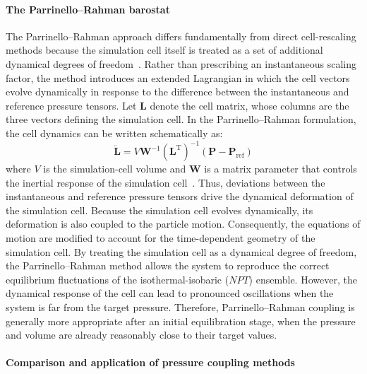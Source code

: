 \paragraph{The Parrinello--Rahman barostat}
The Parrinello--Rahman approach differs fundamentally from direct cell-rescaling methods because the simulation cell itself is treated as a set of additional dynamical degrees of freedom~\cite{Parrinello1981}. Rather than prescribing an instantaneous scaling factor, the method introduces an extended Lagrangian in which the cell vectors evolve dynamically in response to the difference between the instantaneous and reference pressure tensors.
Let $\mathbf{L}$ denote the cell matrix, whose columns are the three vectors defining the simulation cell. In the Parrinello--Rahman formulation, the cell dynamics can be written schematically as:
\begin{equation}\label{eq:parrinellorahman1}
\ddot{\mathbf{L}}
=
V\mathbf{W}^{-1}
\left(\mathbf{L}^{\mathrm{T}}\right)^{-1}
\left(
\mathbf{P}
-
\mathbf{P}_{\mathrm{ref}}
\right)
\end{equation}
where $V$ is the simulation-cell volume and $\mathbf{W}$ is a matrix parameter that controls the inertial response of the simulation cell~\cite{Gromacs2015}. Thus, deviations between the instantaneous and reference pressure tensors drive the dynamical deformation of the simulation cell.
Because the simulation cell evolves dynamically, its deformation is also coupled to the particle motion. Consequently, the equations of motion are modified to account for the time-dependent geometry of the simulation cell. By treating the simulation cell as a dynamical degree of freedom, the Parrinello--Rahman method allows the system to reproduce the correct equilibrium fluctuations of the isothermal-isobaric ($NPT$) ensemble.
However, the dynamical response of the cell can lead to pronounced oscillations when the system is far from the target pressure. Therefore, Parrinello--Rahman coupling is generally more appropriate after an initial equilibration stage, when the pressure and volume are already reasonably close to their target values.




\paragraph{Comparison and application of pressure coupling methods}

